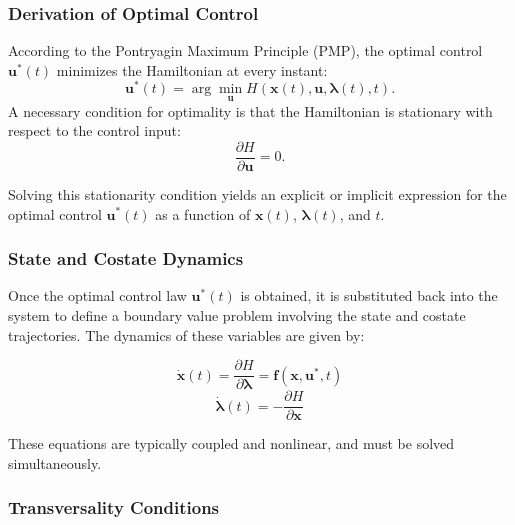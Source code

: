 \subsubsection*{Derivation of Optimal Control}

According to the Pontryagin Maximum Principle (PMP), the optimal control \( \mathbf{u}^*(t) \) minimizes the Hamiltonian at every instant:
\begin{equation} \label{eq:optimal_control_condition}
\mathbf{u}^*(t) = \arg\min_{\mathbf{u}} H(\mathbf{x}(t), \mathbf{u}, \boldsymbol{\lambda}(t), t).
\end{equation}
A necessary condition for optimality is that the Hamiltonian is stationary with respect to the control input:
\begin{equation} \label{eq:control_stationarity}
\frac{\partial H}{\partial \mathbf{u}} = 0.
\end{equation}

Solving this stationarity condition yields an explicit or implicit expression for the optimal control \( \mathbf{u}^*(t) \) as a function of \( \mathbf{x}(t) \), \( \boldsymbol{\lambda}(t) \), and \( t \).

\subsubsection*{State and Costate Dynamics}

Once the optimal control law \( \mathbf{u}^*(t) \) is obtained, it is substituted back into the system to define a boundary value problem involving the state and costate trajectories. The dynamics of these variables are given by:

\begin{equation} \label{eq:state_dynamics}
\dot{\mathbf{x}}(t) = \frac{\partial H}{\partial \boldsymbol{\lambda}} = \mathbf{f}(\mathbf{x}, \mathbf{u}^*, t) \tag{State dynamics}
\end{equation}
\begin{equation} \label{eq:costate_dynamics}
\dot{\boldsymbol{\lambda}}(t) = -\frac{\partial H}{\partial \mathbf{x}} \tag{Costate dynamics}
\end{equation}

These equations are typically coupled and nonlinear, and must be solved simultaneously.

\subsubsection*{Transversality Conditions}


